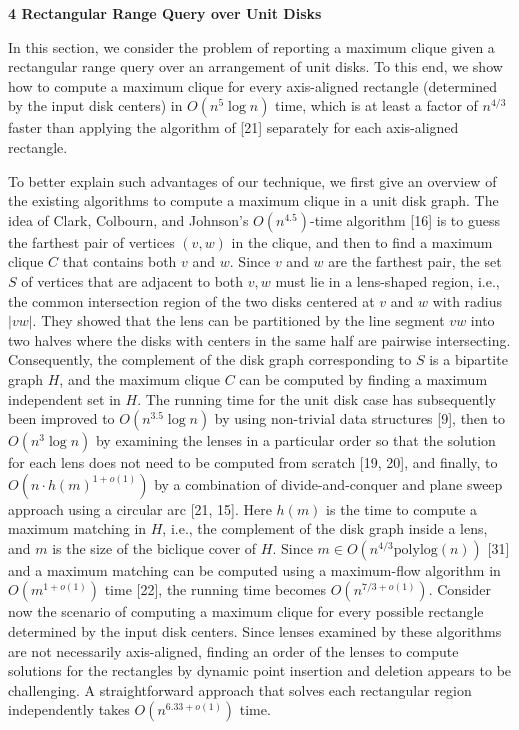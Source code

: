 \documentclass[10pt,a4paper]{amsart}
\begin{document}
\par\medskip\noindent\textbf{4 Rectangular Range Query over Unit Disks}\par
In this section, we consider the problem of reporting a maximum clique given a rectangular range query over an arrangement of unit disks. To this end, we show how to compute a maximum clique for every axis-aligned rectangle (determined by the input disk centers) in $O(n^{5}\log n)$ time, which is at least a factor of $n^{4/3}$ faster than applying the algorithm of [21] separately for each axis-aligned rectangle.
\par
\par
To better explain such advantages of our technique, we first give an overview of the existing algorithms to compute a maximum clique in a unit disk graph. The idea of Clark, Colbourn, and Johnson’s $O(n^{4.5})$-time algorithm [16] is to guess the farthest pair of vertices $(v,w)$ in the clique, and then to find a maximum clique $C$ that contains both $v$ and $w$. Since $v$ and $w$ are the farthest pair, the set $S$ of vertices that are adjacent to both $v,w$ must lie in a lens-shaped region, i.e., the common intersection region of the two disks centered at $v$ and $w$ with radius $|vw|$. They showed that the lens can be partitioned by the line segment $vw$ into two halves where the disks with centers in the same half are pairwise intersecting. Consequently, the complement of the disk graph corresponding to $S$ is a bipartite graph $H$, and the maximum clique $C$ can be computed by finding a maximum independent set in $H$. The running time for the unit disk case has subsequently been improved to $O(n^{3.5}\log n)$ by using non-trivial data structures [9], then to $O(n^{3}\log n)$ by examining the lenses in a particular order so that the solution for each lens does not need to be computed from scratch [19, 20], and finally, to $O(n\cdot h(m)^{1+o(1)})$ by a combination of divide-and-conquer and plane sweep approach using a circular arc [21, 15]. Here $h(m)$ is the time to compute a maximum matching in $H$, i.e., the complement of the disk graph inside a lens, and $m$ is the size of the biclique cover of $H$. Since $m\in O(n^{4/3}\mathrm{polylog}(n))$ [31] and a maximum matching can be computed using a maximum-flow algorithm in $O(m^{1+o(1)})$ time [22], the running time becomes $O(n^{7/3+o(1)})$. Consider now the scenario of computing a maximum clique for every possible rectangle determined by the input disk centers. Since lenses examined by these algorithms are not necessarily axis-aligned, finding an order of the lenses to compute solutions for the rectangles by dynamic point insertion and deletion appears to be challenging. A straightforward approach that solves each rectangular region independently takes $O(n^{6.33+o(1)})$ time.
\end{document}

